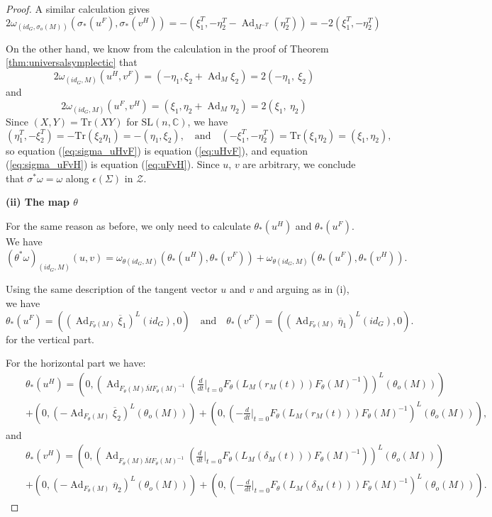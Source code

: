 \documentclass[a4paper,12pt,leqno]{amsart}
\numberwithin{equation}{section}
\theoremstyle{plain}
\theoremstyle{definition}
\DeclareMathOperator{\Ad}{Ad}
\newcommand{\SL}{\textrm{SL}}
\newcommand{\cZ}{\mathcal{Z}}
\newcommand{\bC}{\mathbb{C}}
\newcommand{\Tr}{\mathrm{Tr}}
\begin{document}
\begin{proof}
A similar calculation gives 
\begin{equation}\label{eq:sigma_uFvH}
2\omega_{(id_G, \sigma_o(M) )}(\sigma_*(u^F),\sigma_*(v^H))=-(\xi_1^T,-\eta_2^T-\Ad_{M^{-T}}(\eta_2^T) )=-2(\xi_1^T,-\eta_2^T)
\end{equation}

On the other hand, we know from the calculation in the proof of Theorem \ref{thm:universalsymplectic} that
\begin{equation}\label{eq:uHvF}
2\omega_{(id_G,M)}(u^H,v^F)=(-\eta_1,\xi_2+\Ad_M\xi_2)=2(-\eta_1,\ \xi_2)
\end{equation}
and
\begin{equation}\label{eq:uFvH}
2\omega_{(id_G,M)}(u^F,v^H)=(\xi_1,\eta_2+\Ad_M\eta_2)=2(\xi_1,\ \eta_2)
\end{equation}
Since $(X,Y)=\Tr(XY)$ for $\SL(n,\bC)$, we have
$$(\eta_1^T,-\xi_2^T )=-\Tr(\xi_2\eta_1)=-(\eta_1,\xi_2), \quad\mbox{and}\quad (-\xi_1^T,-\eta_2^T)=\Tr(\xi_1\eta_2)=(\xi_1,\eta_2),$$
so equation (\ref{eq:sigma_uHvF}) is equation (\ref{eq:uHvF}), and equation (\ref{eq:sigma_uFvH}) is equation (\ref{eq:uFvH}). 
Since $u$, $v$ are arbitrary, we conclude that $\sigma^*\omega=\omega$ along $\epsilon(\Sigma)$ in $\cZ$.

{\bf (ii) The map $\theta$}

For the same reason as before, we only need to calculate $\theta_*(u^H)$ and $\theta_*(u^F)$.
We have
\[(\theta^*\omega)_{(id_G,M)}(u,v)
=\omega_{\theta(id_G,M)}(\theta_*(u^H),\theta_*(v^F))+\omega_{\theta(id_G,M)}(\theta_*(u^F),\theta_*(v^H)).
\]

Using the same description of the tangent vector $u$ and $v$ and arguing as in (i), we have
\[\theta_*(u^F)=( (\Ad_{F_\theta(M)} \overline{\xi}_1)^L (id_G), 0 )\quad \mbox{and} \quad
\theta_*(v^F)=( (\Ad_{F_\theta(M)}\overline{\eta}_1)^L(id_G),0 ).\]
for the vertical part.

For the horizontal part we have:
\begin{eqnarray*}
&&\theta_*(u^H)=\left( 0, \left( \Ad_{F_\theta(M) \overline{M} F_\theta(M)^{-1}}( \tfrac{d}{dt}|_{t=0}F_\theta(L_M(r_M(t)))F_\theta(M)^{-1}) \right)^L (\theta_o(M) ) \right) \\&&
+ \left( 0, \left( -\Ad_{F_\theta(M)}\overline{\xi}_2 \right)^L(\theta_o(M) ) \right) + \left( 0,\left( -\tfrac{d}{dt}|_{t=0}F_\theta(L_M(r_M(t)))F_\theta(M)^{-1} \right)^L( \theta_o(M) ) \right),
\end{eqnarray*}
and
\begin{eqnarray*}
&&\theta_*(v^H)=\left( 0, \left( \Ad_{F_\theta(M) \overline{M} F_\theta(M)^{-1}}( \tfrac{d}{dt}|_{t=0}F_\theta(L_M(\delta_M(t)))F_\theta(M)^{-1}) \right)^L (\theta_o(M) ) \right) \\&&
+ \left( 0, \left( -\Ad_{F_\theta(M)}\overline{\eta}_2 \right)^L(\theta_o(M) ) \right) + \left( 0,\left( -\tfrac{d}{dt}|_{t=0}F_\theta(L_M(\delta_M(t)))F_\theta(M)^{-1} \right)^L( \theta_o(M) ) \right).
\end{eqnarray*}


\end{proof}
\end{document}
